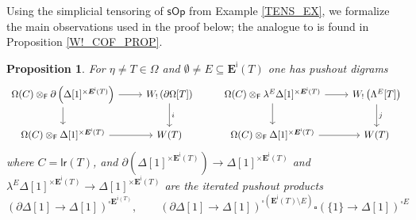 \documentclass[a4paper,10pt
,draft
]{article}%
\numberwithin{equation}{section}
\numberwithin{figure}{section}
\newtheorem{proposition}[equation]{Proposition}%
\theoremstyle{definition} %
\newtheorem{remark}[equation]{Remark}%
\newcommand{\set}[1]{\left\{#1\right\}}%
\newcommand{\vect}[1]{\text{\overrightharp{\ensuremath{#1}}}}
\newcommand{\sOp}{\ensuremath{\mathsf{sOp}}}%
\newcommand{\1}{\ensuremath{\mathbbm 1}}%
\begin{document}
Using the simplicial tensoring of $\sOp$ from Example \ref{TENS_EX},
we formalize the main observations used in the proof \cite[Prop. 4.5]{CM13b} below;
the analogue to \cite[Prop. 4.8]{CM13b} is found in Proposition \ref{W!_COF_PROP}.
\begin{proposition}
      \label{WLEFTQPUSH PROP}
      For $\eta \neq T \in \Omega$
      and $\emptyset \neq E \subseteq \boldsymbol{E}^{\mathsf{i}}(T)$
      one has pushout digrams
\begin{equation}\label{WLEFTQPUSH_EQ}
	\begin{tikzcd}
		\Omega(C) \otimes_{\mathsf{F}}
		\partial \left(\Delta[1]^{\times \boldsymbol{E}^{\mathsf{i}}(T)}\right)
		\ar{r} \ar{d}
	&
		W_! \left(\partial \Omega[T]\right) 
		\arrow[d, "i"]
	& %
		\Omega(C) \otimes_{\mathsf{F}}
		\lambda^E \Delta[1]^{\times \boldsymbol{E}^{\mathsf{i}}(T)}
		\ar{r} \ar{d}
	&
		W_! \left(\Lambda^E[T]\right) 
		\arrow[d, "j"]
\\
		\Omega(C) \otimes_{\mathsf{F}}
		\Delta[1]^{\times \boldsymbol{E}^{\mathsf{i}}(T)}
		\ar{r}
	&
		W(T)
	& %
		\Omega(C) \otimes_{\mathsf{F}}
		\Delta[1]^{\times \boldsymbol{E}^{\mathsf{i}}(T)}
		\ar{r}
	&
		W(T)
	\end{tikzcd}
\end{equation}
      where
      $C = \mathsf{lr}(T)$, and
      $\partial \left(\Delta[1]^{\times \boldsymbol{E}^{\mathsf{i}}(T)}\right)
      \to
      \Delta[1]^{\times \boldsymbol{E}^{\mathsf{i}}(T)}$
      and
      $\lambda^E \Delta[1]^{\times \boldsymbol{E}^{\mathsf{i}}(T)}
      \to \Delta[1]^{\times \boldsymbol{E}^{\mathsf{i}}(T)}$
      are the iterated pushout products
      \[
            \left(
                  \partial\Delta[1] \to \Delta[1]
            \right)^{\square \boldsymbol E^{i(T)}},
            \qquad
            \left(
                  \partial \Delta[1] \to \Delta[1]
            \right)^{\square (\boldsymbol{E}^{\mathsf{i}}(T) \setminus E)}
            \square
            \left(
                  \{1\} \to \Delta[1]
            \right)^{\square E}
      \]
\end{proposition}
\end{document}
